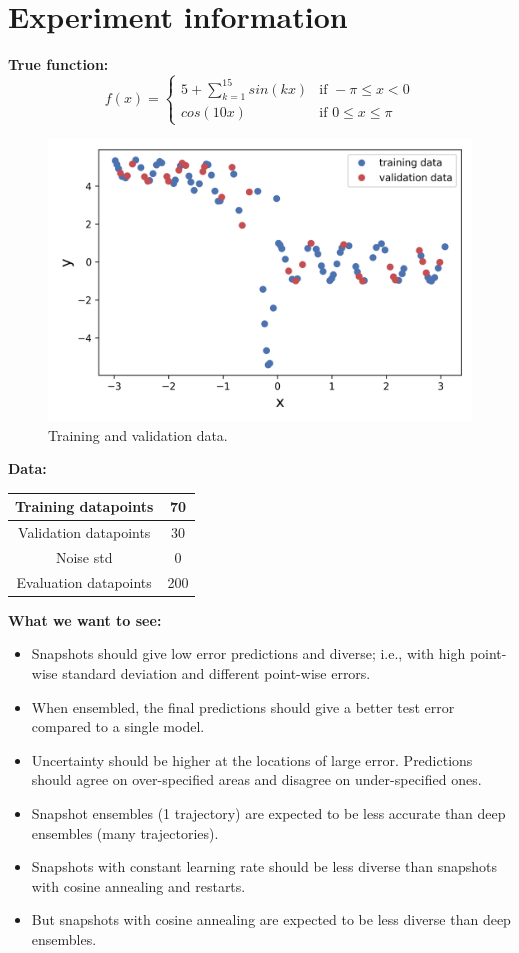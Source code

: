 \section{Experiment information}
\noindent
\textbf{True function:}
\begin{equation}
f(x) = 
\begin{cases} 
5 + \sum_{k = 1}^{15} sin(kx) &\text{if } - \pi \leq x < 0\\
cos(10x) & \text{if } 0 \leq x \leq \pi
\end{cases}
\end{equation}
\begin{figure}[H]
	\centering
	\includegraphics[width=.7\linewidth]{./figs/datapoints.png}  
	\caption{Training and validation data.}
	\label{}
\end{figure}

\noindent
\textbf{Data:}
\begin{center}
	\begin{tabular}{ | c || c |} 
		\hline
		Training datapoints & 70 \\
		\hline
		Validation datapoints & 30 \\
		\hline
		Noise std & 0 \\
		\hline
		Evaluation datapoints & 200 \\
		\hline
	\end{tabular}
\end{center}


\noindent
\textbf{What we want to see:}
\begin{itemize}
	\item Snapshots should give low error predictions and diverse; i.e., with high point-wise standard deviation and different point-wise errors.
	\item When ensembled, the final predictions should give a better test error compared to a single model.
	\item Uncertainty should be higher at the locations of large error. Predictions should agree on over-specified areas and disagree on under-specified ones.
	\item Snapshot ensembles (1 trajectory) are expected to be less accurate than deep ensembles (many trajectories). 
	\item Snapshots with constant learning rate should be less diverse than snapshots with cosine annealing and restarts.
	\item But snapshots with cosine annealing are expected to be less diverse than deep ensembles.	
\end{itemize}

